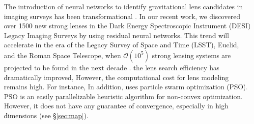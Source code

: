 The introduction of neural networks to identify gravitational lens candidates in imaging surveys has 
been transformational \citep[e.g.,][]{jacobs2017a, metcalf2018a, jacobs2019a, jacobs2019b, canameras2020a}. 
In our recent work, 
we discovered over 1500  
new strong lenses \citep{huang2020a, huang2021a}
in the Dark Energy Spectroscopic Instrument (DESI) Legacy Imaging Surveys  by using residual neural networks. 
This trend will accelerate in the era of the  Legacy Survey of Space and Time (LSST), Euclid, and the  Roman Space Telescope, 
when $\mathcal{O}(10^5)$ strong lensing systems are projected to be found in the next decade \citep{collett2015a}. 
 the lens search efficiency has dramatically improved, 
However, the computational cost for lens modeling remains high.
For instance, \citet{rojas2021a} 
In addition, \lenstr uses particle swarm optimization (PSO). PSO is an easily parallelizable heuristic algorithm for non-convex optimization. However, it does not have any guarantee of convergence, especially in high dimensions (see \S\ref{sec:map}).
